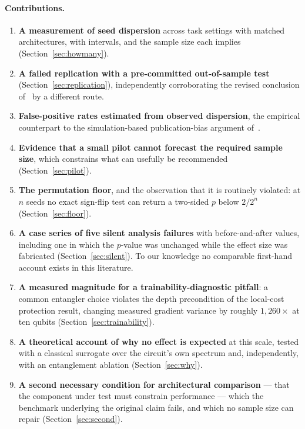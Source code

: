 \documentclass[11pt,onecolumn]{article}
\begin{document}
\paragraph{Contributions.}
\begin{enumerate}\itemsep3pt
\item \textbf{A measurement of seed dispersion} across task settings
      with matched architectures, with intervals, and the sample size
      each implies (Section~\ref{sec:howmany}).
\item \textbf{A failed replication with a pre-committed out-of-sample
      test} (Section~\ref{sec:replication}), independently corroborating
      the revised conclusion of~\cite{qasa} by a different route.
\item \textbf{False-positive rates estimated from observed dispersion},
      the empirical counterpart to the simulation-based
      publication-bias argument of~\cite{bowles2024}.
\item \textbf{Evidence that a small pilot cannot forecast the required
      sample size}, which constrains what can usefully be recommended
      (Section~\ref{sec:pilot}).
\item \textbf{The permutation floor}, and the observation that it is
      routinely violated: at $n$ seeds no exact sign-flip test can
      return a two-sided $p$ below $2/2^n$
      (Section~\ref{sec:floor}).
\item \textbf{A case series of five silent analysis failures} with
      before-and-after values, including one in which the $p$-value was
      unchanged while the effect size was fabricated
      (Section~\ref{sec:silent}). To our knowledge no comparable
      first-hand account exists in this literature.
\item \textbf{A measured magnitude for a trainability-diagnostic
      pitfall}: a common entangler choice violates the depth
      precondition of the local-cost protection result, changing
      measured gradient variance by roughly $1{,}260\times$ at ten
      qubits (Section~\ref{sec:trainability}).
\item \textbf{A theoretical account of why no effect is expected} at
      this scale, tested with a classical surrogate over the circuit's
      own spectrum and, independently, with an entanglement ablation
      (Section~\ref{sec:why}).
\item \textbf{A second necessary condition for architectural
      comparison} --- that the component under test must constrain
      performance --- which the benchmark underlying the original claim
      fails, and which no sample size can repair
      (Section~\ref{sec:second}).
\end{enumerate}
\end{document}
